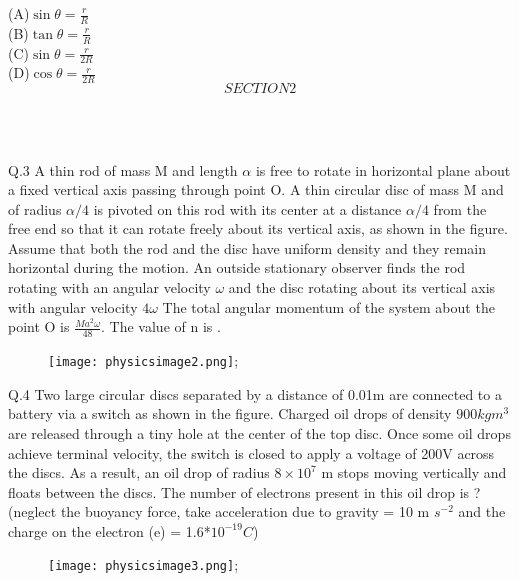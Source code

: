 \documentclass[11pt]{article}
\begin{document}
(A)$\sin\theta=\frac{r}{R}$\\
(B)$\tan\theta=\frac{r}{R}$\\
(C)$\sin\theta=\frac{r}{2R}$\\
(D)$\cos\theta=\frac{r}{2R}$\\
                        $$SECTION2$$\\
\begin{center}
 \\
\end{center}  
Q.3 A thin rod of mass M and length $\alpha$ is free to rotate in horizontal plane about a fixed vertical axis passing through point O. A thin circular disc of mass M and of radius $\alpha /4$ is pivoted on this rod with its center at a distance $\alpha /4$ from the free end so that it can rotate freely about its vertical axis, as shown in the figure. Assume that both the rod and the disc have uniform density and they remain horizontal during the motion. An outside stationary observer finds the rod rotating with an angular velocity  $\omega$ and the disc rotating about its vertical axis with angular velocity $4\omega$ The total angular momentum of the system about the point O is $\frac{Ma^2\omega}{48}$. The value of n is .
\newpage
\begin{center}
\begin{figure}
\texttt{[image: physicsimage2.png]};
\end{figure}
\end{center}
Q.4 Two large circular discs separated by a distance of 0.01m are connected to a battery via a switch as shown in the figure. Charged oil drops of density $900 kg m^3$ are released through a tiny hole at the center of the top disc. Once some oil drops achieve terminal velocity, the switch is closed to apply a voltage of 200V across the discs. As a result, an oil drop of radius $8×10^7$ m stops moving
vertically and floats between the discs. The number of electrons present in this oil drop is ?(neglect the buoyancy force, take acceleration due to gravity = 10 m $s^{-2}$ and the charge on the electron (e) = 1.6*$10^{-19}C$)
\newpage
\begin{center}
\begin{figure}
\texttt{[image: physicsimage3.png]};
\end{figure}
\end{center}
\end{document}
